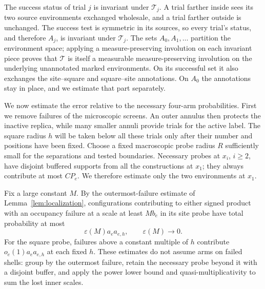The success status of trial $j$ is invariant under $\mathcal T_j$.  A trial farther
inside sees its two source environments exchanged wholesale, and a trial
farther outside is unchanged.  The success test is symmetric in its
sources, so every trial's status, and therefore $A_j$, is invariant under
$\mathcal T_j$.  The sets $A_0,A_1,\ldots$ partition the environment space; applying
a measure-preserving involution on each invariant piece proves that $\mathcal T$
is itself a measurable measure-preserving involution on the underlying
unannotated marked environments.  On its successful set it also exchanges
the site--square and square--site annotations.  On $A_0$ the annotations
stay in place, and we estimate that part separately.

We now estimate the error relative to the necessary four-arm probabilities.
First we remove failures of the microscopic screens.  An outer annulus
then protects the inactive replica, while many smaller annuli provide
trials for the active label.  The square radius $h$ will be taken below
all these trials only after their number and positions have been fixed.
Choose a fixed macroscopic probe radius $R$ sufficiently small for the
separations and tested boundaries.  Necessary probes at $x_i$, $i\ge2$,
have disjoint buffered supports from all the constructions at $x_1$;
they always contribute at most $C P_e$.  We therefore estimate only the
two environments at $x_1$.

Fix a large constant $M$.  By the outermost-failure estimate of
Lemma~\ref{lem:localization}, configurations contributing to either signed
product with an occupancy failure at a scale at least $M b_e$ in its site
probe have total probability at most
\begin{equation}
 \varepsilon(M)a_ea_{e,h},\qquad \varepsilon(M)\longrightarrow0.
 \label{eq:site-cutoff-error}
\end{equation}
For the square probe, failures above a constant multiple of $h$ contribute
$o_e(1)a_ea_{e,h}$ at each fixed $h$.  These estimates do not assume arms
on failed shells: group by the outermost failure, retain the necessary
probe beyond it with a disjoint buffer, and apply the power lower bound
and quasi-multiplicativity to sum the lost inner scales.

